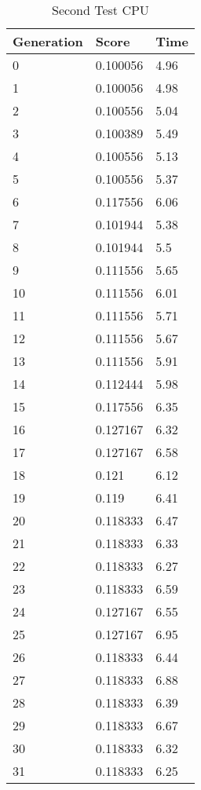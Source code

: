 \begin{table}
\caption{Second Test CPU}
\centering
 \begin{tabular}{ | l | l | l |}
    \hline
    Generation & Score & Time \\ \hline
    0 & 0.100056 & 4.96 \\ \hline
    1 & 0.100056 & 4.98 \\ \hline
    2 & 0.100556 & 5.04 \\ \hline
    3 & 0.100389 & 5.49 \\ \hline
    4 & 0.100556 & 5.13 \\ \hline
    5 & 0.100556 & 5.37 \\ \hline
    6 & 0.117556 & 6.06 \\ \hline
    7 & 0.101944 & 5.38 \\ \hline
    8 & 0.101944 & 5.5 \\ \hline
    9 & 0.111556 & 5.65 \\ \hline
    10 & 0.111556 & 6.01 \\ \hline
    11 & 0.111556 & 5.71 \\ \hline
    12 & 0.111556 & 5.67 \\ \hline
    13 & 0.111556 & 5.91 \\ \hline
    14 & 0.112444 & 5.98 \\ \hline
    15 & 0.117556 & 6.35 \\ \hline
    16 & 0.127167 & 6.32 \\ \hline
    17 & 0.127167 & 6.58 \\ \hline
    18 & 0.121 & 6.12 \\ \hline
    19 & 0.119 & 6.41 \\ \hline
    20 & 0.118333 & 6.47 \\ \hline
    21 & 0.118333 & 6.33 \\ \hline
    22 & 0.118333 & 6.27 \\ \hline
    23 & 0.118333 & 6.59 \\ \hline
    24 & 0.127167 & 6.55 \\ \hline
    25 & 0.127167 & 6.95 \\ \hline
    26 & 0.118333 & 6.44 \\ \hline
    27 & 0.118333 & 6.88 \\ \hline
    28 & 0.118333 & 6.39 \\ \hline
    29 & 0.118333 & 6.67 \\ \hline
    30 & 0.118333 & 6.32 \\ \hline
    31 & 0.118333 & 6.25 \\ \hline

\end{tabular}
\end{table}
